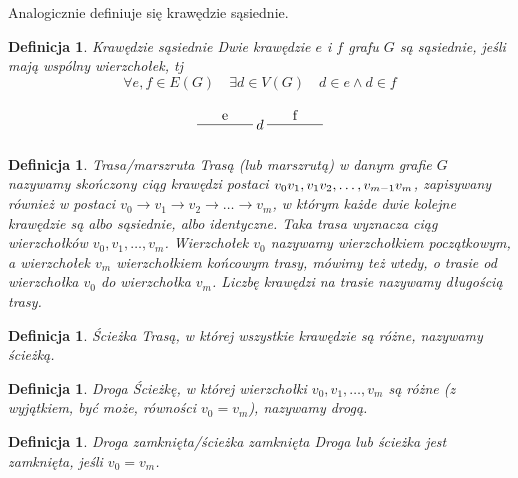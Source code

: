 \documentclass[12pt,a4paper]{report}
\newtheorem{definition}[theorem]{Definicja}
\begin{document}
Analogicznie definiuje się krawędzie sąsiednie.


\begin{definition}{Krawędzie sąsiednie \cite[Rozdział 2]{wilson2008}}
Dwie krawędzie $e$ i $f$ grafu $G$ są sąsiednie, jeśli mają wspólny wierzchołek, tj
$$
\forall{e, f} \in E(G) \quad \exists{d}\in V(G) \quad d \in e \land d\in f
$$

$$
\begin{tikzpicture}[scale=.7]
  \draw (-1.75,0)-- node[above] {f} ++(2,0);
  \draw node(d) at (-2,0) {$d$};
  \draw (-4.25,0) --node[above] {e} ++(2,0);
\end{tikzpicture}
$$
\end{definition}


\begin{definition}{Trasa/marszruta \cite[Rozdział 3]{wilson2008}}
Trasą (lub marszrutą) w danym grafie $G$ nazywamy skończony ciąg krawędzi postaci $v_{0}v_{1}, v_{1}v_{2}, \ldots, \newline v_{m-1}v_{m}$, zapisywany również w postaci $v_{0} \rightarrow{} v_{1} \rightarrow{} v_{2} \rightarrow{} \ldots \rightarrow{} v_{m}$, w którym każde dwie kolejne krawędzie są albo sąsiednie, albo identyczne. Taka trasa wyznacza ciąg wierzchołków $v_{0}, v_{1}, \ldots, v_{m}$. Wierzchołek $v_{0}$ nazywamy wierzchołkiem początkowym, a wierzchołek $v_{m}$ wierzchołkiem końcowym trasy, mówimy też wtedy, o trasie od wierzchołka $v_{0}$ do wierzchołka $v_{m}$. Liczbę krawędzi na trasie nazywamy długością trasy. 
\end{definition}



\begin{definition}{Ścieżka \cite[Rozdział 3]{wilson2008}}
Trasą, w której wszystkie krawędzie są różne, nazywamy ścieżką.
\end{definition}


\begin{definition}{Droga \cite[Rozdział 3]{wilson2008}}
Ścieżkę, w której wierzchołki $v_{0}, v_{1}, \ldots, v_{m}$ są różne (z wyjątkiem, być może, równości $v_{0}=v_{m}$), nazywamy drogą. 
\end{definition}


\begin{definition}{Droga zamknięta/ścieżka zamknięta \cite[Rozdział 3]{wilson2008}}
Droga lub ścieżka jest zamknięta, jeśli $v_{0}=v_{m}$.
\end{definition}
\end{document}
